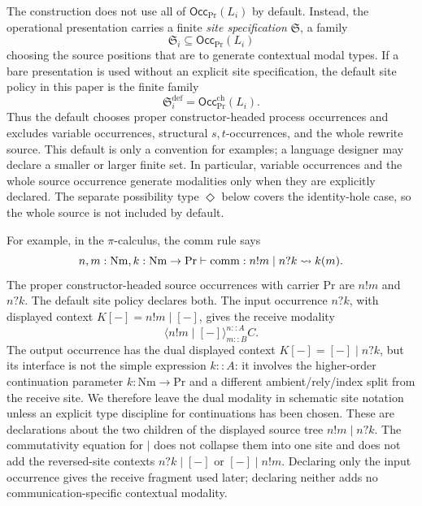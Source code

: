 \documentclass[11pt]{article}
\newcommand{\Proc}{\mathrm{Pr}}
\newcommand{\Nm}{\mathrm{Nm}}
\newcommand{\rw}{\rightsquigarrow}
\newcommand{\ty}{\mathrel{::}}
\newcommand{\Dia}{\Diamond}
\newcommand{\Occ}{\mathsf{Occ}}
\begin{document}
The construction does not use all of \(\Occ_{\Proc}(L_i)\) by default.  Instead,
the operational presentation carries a finite \emph{site specification}
\(\mathfrak{S}\), a family
\[
  \mathfrak{S}_i\subseteq \Occ_{\Proc}(L_i)
\]
choosing the source positions that are to generate contextual modal types.  If a
bare presentation is used without an explicit site specification, the default
site policy in this paper is the finite family
\[
  \mathfrak{S}^{\mathrm{def}}_i
  =
  \Occ^{\mathrm{ch}}_{\Proc}(L_i).
\]
Thus the default chooses proper constructor-headed process occurrences and
excludes variable occurrences, structural \(s,t\)-occurrences, and the whole
rewrite source.  This default is only a convention for examples; a language
designer may declare a smaller or larger finite set.  In particular, variable
occurrences and the whole source occurrence generate modalities only when they
are explicitly declared.  The separate possibility type \(\Dia\) below covers
the identity-hole case, so the whole source is not included by default.

For example, in the $\pi$-calculus, the comm rule says
\[
    n,m: \Nm, k:\Nm \to \Proc \vdash {\rm comm}: n!m \;|\; n?k \rw k(m).
\]
The proper constructor-headed source occurrences with carrier \(\Proc\) are
\(n!m\) and \(n?k\).  The default site policy declares both.  The input occurrence \(n?k\), with displayed context \(K[-]=n!m\mid[-]\), gives the receive modality
\[
    \langle n!m \;|\; [-]\rangle^{n\ty A}_{m\ty B}C.
\]
The output occurrence has the dual displayed context \(K[-]=[-]\mid n?k\), but its interface is not the simple expression \(k\ty A\): it involves the higher-order continuation parameter \(k:\Nm\to\Proc\) and a different ambient/rely/index split from the receive site.  We therefore leave the dual modality in schematic site notation unless an explicit type discipline for continuations has been chosen.  These are declarations about the two children of the displayed source tree \(n!m\;|\;n?k\).  The commutativity equation for \(\mid\) does not collapse them into one site and does not add the reversed-site contexts \(n?k\;|\;[-]\) or \([-]\;|\;n!m\).  Declaring only the input occurrence gives the receive fragment used later; declaring neither adds no communication-specific contextual modality.
\end{document}
